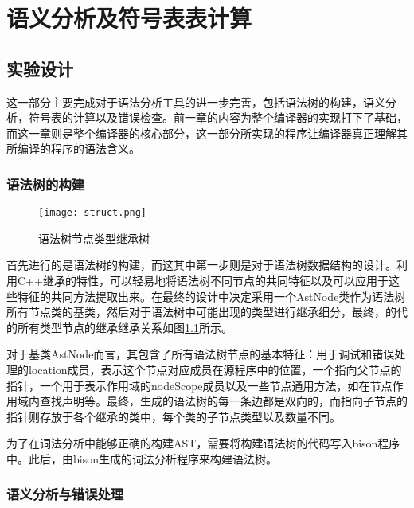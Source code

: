 \chapter{语义分析及符号表表计算}
\label{cha:yu_yi_fen_xi_ji_fu_hao_biao_biao_ji_suan_}

\section{实验设计}
\label{sec:shi_yan_she_ji_2}

\par 这一部分主要完成对于语法分析工具的进一步完善，包括语法树的构建，语义分析，符号表的计算以及错误检查。前一章的内容为整个编译器的实现打下了基础，而这一章则是整个编译器的核心部分，这一部分所实现的程序让编译器真正理解其所编译的程序的语法含义。

\subsection{语法树的构建}
\label{sub:yu_fa_shu_de_gou_jian_}

\begin{figure}[htpb]
    \centering
    \texttt{[image: struct.png]}
    \caption{语法树节点类型继承树}
    \label{fig:struct}
\end{figure}

\par 首先进行的是语法树的构建，而这其中第一步则是对于语法树数据结构的设计。利用C++继承的特性，可以轻易地将语法树不同节点的共同特征以及可以应用于这些特征的共同方法提取出来。在最终的设计中决定采用一个AstNode类作为语法树所有节点类的基类，然后对于语法树中可能出现的类型进行继承细分，最终，的代的所有类型节点的继承继承关系如图\ref{fig:struct}所示。

\par 对于基类AstNode而言，其包含了所有语法树节点的基本特征：用于调试和错误处理的location成员，表示这个节点对应成员在源程序中的位置，一个指向父节点的指针，一个用于表示作用域的nodeScope成员以及一些节点通用方法，如在节点作用域内查找声明等。最终，生成的语法树的每一条边都是双向的，而指向子节点的指针则存放于各个继承的类中，每个类的子节点类型以及数量不同。
\par 为了在词法分析中能够正确的构建AST，需要将构建语法树的代码写入bison程序中。此后，由bison生成的词法分析程序来构建语法树。

\subsection{语义分析与错误处理}
\label{sub:yu_yi_fen_xi_}

